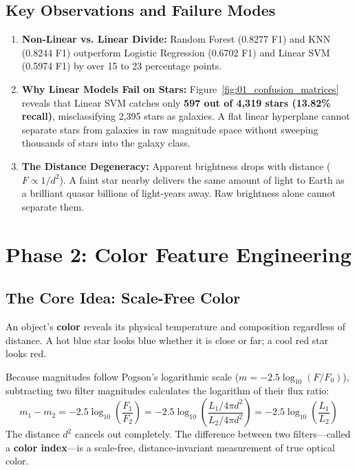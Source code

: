 \documentclass[11pt,a4paper]{article}
\begin{document}
\subsection{Key Observations and Failure Modes}
\begin{enumerate}[noitemsep]
    \item \textbf{Non-Linear vs. Linear Divide:} Random Forest (0.8277 F1) and KNN (0.8244 F1) outperform Logistic Regression (0.6702 F1) and Linear SVM (0.5974 F1) by over 15 to 23 percentage points.
    \item \textbf{Why Linear Models Fail on Stars:} Figure~\ref{fig:01_confusion_matrices} reveals that Linear SVM catches only \textbf{597 out of 4,319 stars (13.82\% recall)}, misclassifying 2,395 stars as galaxies. A flat linear hyperplane cannot separate stars from galaxies in raw magnitude space without sweeping thousands of stars into the galaxy class.
    \item \textbf{The Distance Degeneracy:} Apparent brightness drops with distance ($F \propto 1/d^2$). A faint star nearby delivers the same amount of light to Earth as a brilliant quasar billions of light-years away. Raw brightness alone cannot separate them.
\end{enumerate}

\section{Phase 2: Color Feature Engineering}

\subsection{The Core Idea: Scale-Free Color}
An object's \textbf{color} reveals its physical temperature and composition regardless of distance. A hot blue star looks blue whether it is close or far; a cool red star looks red. 

Because magnitudes follow Pogson's logarithmic scale ($m = -2.5 \log_{10}(F/F_0)$), subtracting two filter magnitudes calculates the logarithm of their flux ratio:
\begin{equation}
    m_1 - m_2 = -2.5 \log_{10}\left(\frac{F_1}{F_2}\right) = -2.5 \log_{10}\left(\frac{L_1 / 4\pi d^2}{L_2 / 4\pi d^2}\right) = -2.5 \log_{10}\left(\frac{L_1}{L_2}\right)
\end{equation}
The distance $d^2$ cancels out completely. The difference between two filters---called a \textbf{color index}---is a scale-free, distance-invariant measurement of true optical color.
\end{document}
